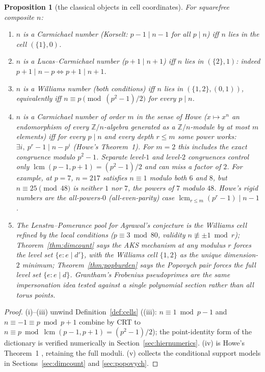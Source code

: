 \documentclass[11pt]{article}
\newtheorem{proposition}[theorem]{Proposition}
\theoremstyle{remark}
\newcommand{\Z}{\mathbb{Z}}
\DeclareMathOperator{\lcm}{lcm}
\begin{document}
\begin{proposition}[the classical objects in cell coordinates]\label{prop:celldict}
For squarefree composite $n$:
\begin{enumerate}
\item[(i)] $n$ is a Carmichael number (Korselt: $p - 1 \mid n - 1$ for all
$p \mid n$) iff $n$ lies in the cell $(\{1\}, 0)$.
\item[(ii)] $n$ is a Lucas--Carmichael number ($p + 1 \mid n + 1$) iff $n$
lies in $(\{2\}, 1)$: indeed $p + 1 \mid n - p \iff p + 1 \mid n + 1$.
\item[(iii)] $n$ is a Williams number \cite{Williams77,Echi07,McIntoshMitra}
(both conditions) iff $n$ lies in $(\{1,2\}, (0,1))$, equivalently iff
$n \equiv p \pmod{(p^2-1)/2}$ for every $p \mid n$.
\item[(iv)] $n$ is a Carmichael number of order $m$ in the sense of Howe
\cite{Howe00} ($x \mapsto x^n$ an endomorphism of every $\Z/n$-algebra
generated as a $\Z/n$-\emph{module} by at most $m$ elements) iff for every
$p \mid n$ and every depth
$r \le m$ some power works: $\exists i,\ p^r - 1 \mid n - p^i$ (Howe's
Theorem~1). For $m=2$ this includes the exact congruence modulo $p^2-1$.
Separate level-$1$ and level-$2$ congruences control only
$\lcm(p-1,p+1)=(p^2-1)/2$ and can miss a factor of $2$.
For example, at $p=7$, $n=217$ satisfies $n\equiv1$ modulo both $6$ and $8$,
but $n\equiv25\pmod{48}$ is neither $1$ nor $7$, the powers of $7$ modulo $48$.
Howe's \emph{rigid} numbers are the all-powers-$0$
(all-even-parity) case $\lcm_{r \le m}(p^r - 1) \mid n - 1$.
\item[(v)] The Lenstra--Pomerance pool for Agrawal's conjecture is the
Williams cell refined by the local conditions ($p \equiv 3 \bmod 80$,
validity $n \not\equiv \pm1 \bmod r$); Theorem~\ref{thm:dimcount} says the
AKS mechanism at any modulus $r$ forces the level set $\{e : e \mid d'\}$,
with the Williams cell $\{1,2\}$ as the unique dimension-$2$ minimum;
Theorem~\ref{thm:popburden} says the Popovych pair forces the full level
set $\{e : e \mid d\}$. Grantham's Frobenius pseudoprimes \cite{Grantham}
are the same impersonation idea tested against a single polynomial section
rather than all torus points.
\end{enumerate}
\end{proposition}

\begin{proof}
(i)--(iii) unwind Definition~\ref{def:cells} ((iii): $n \equiv 1 \bmod p-1$
and $n \equiv -1 \equiv p \bmod p+1$ combine by CRT to
$n \equiv p \bmod \lcm(p-1,p+1) = (p^2-1)/2$); the point-identity form of
the dictionary is verified numerically in Section~\ref{sec:hiernumerics}.
(iv) is Howe's Theorem~1 \cite{Howe00}, retaining the full moduli.
(v) collects the conditional support models in Sections~\ref{sec:dimcount} and
\ref{sec:popovych}.
\end{proof}
\end{document}
